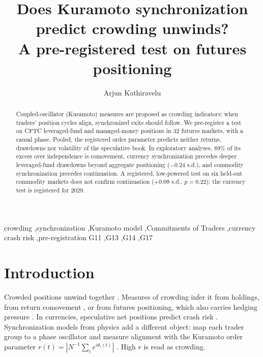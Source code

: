 \documentclass[preprint,12pt,authoryear]{elsarticle}
\begin{document}
\begin{frontmatter}

\title{Does Kuramoto synchronization predict crowding unwinds?\\
A pre-registered test on futures positioning}

\author{Arjun Kathiravelu}
\address{University of Geneva, Geneva, Switzerland}

\begin{abstract}
Coupled-oscillator (Kuramoto) measures are proposed as crowding indicators:
when traders' position cycles align, synchronized exits should follow. We
pre-register a test on CFTC leveraged-fund and managed-money positions in 32
futures markets, with a causal phase. Pooled, the registered order
parameter predicts neither returns, drawdowns nor volatility of the
speculative book. In exploratory analyses, 89\% of its excess over
independence is comovement, currency synchronization precedes deeper
leveraged-fund drawdowns beyond aggregate positioning ($-0.24$ s.d.), and
commodity synchronization precedes continuation. A registered, low-powered
test on six held-out commodity markets does not confirm continuation
($+0.09$ s.d., $p=0.22$); the currency test is registered for 2029.
\end{abstract}

\begin{keyword}
crowding \sep synchronization \sep Kuramoto model \sep Commitments of Traders
\sep currency crash risk \sep pre-registration
\JEL G11 \sep G13 \sep G14 \sep G17
\end{keyword}
\end{frontmatter}

\section{Introduction}

Crowded positions unwind together \citep{Pedersen2009,Stein2009,KhandaniLo2011}.
Measures of crowding infer it from holdings, from return comovement
\citep{LouPolk2022}, or from futures positioning, which also carries hedging
pressure \citep{Bessembinder1992,deRoon2000,KangRouwenhorstTang2020}. In
currencies, speculative net positions predict crash risk
\citep{BrunnermeierNagelPedersen2008}. Synchronization models from physics add
a different object: map each trader group to a phase oscillator and measure
alignment with the Kuramoto order parameter
$r(t) = |N^{-1}\sum_i e^{i\theta_i(t)}|$ \citep{Strogatz2000,Acebron2005}.
High $r$ is read as crowding.
\end{document}
